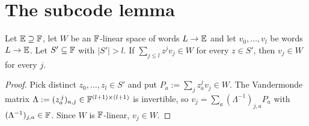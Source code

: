 \section{The subcode lemma}

\begin{lemma}\label{lem:subcode}
Let $\mathbb{E}\supseteq\mathbb{F}$, let $W$ be an $\mathbb{F}$-linear space of words $L\to\mathbb{E}$ and let $v_0,\dots,v_l$ be
words $L\to\mathbb{E}$. Let $S'\subseteq\mathbb{F}$ with $|S'|>l$. If $\sum_{j\le l}z^jv_j\in W$ for every
$z\in S'$, then $v_j\in W$ for every $j$.
\end{lemma}

\begin{proof}
Pick distinct $z_0,\dots,z_l\in S'$ and put $P_a:=\sum_jz_a^jv_j\in W$. The Vandermonde
matrix $\Lambda:=(z_a^{\,j})_{a,j}\in\mathbb{F}^{(l+1)\times(l+1)}$ is invertible, so
$v_j=\sum_a(\Lambda^{-1})_{j,a}P_a$ with $(\Lambda^{-1})_{j,a}\in\mathbb{F}$. Since $W$ is $\mathbb{F}$-linear,
$v_j\in W$.
\end{proof}

